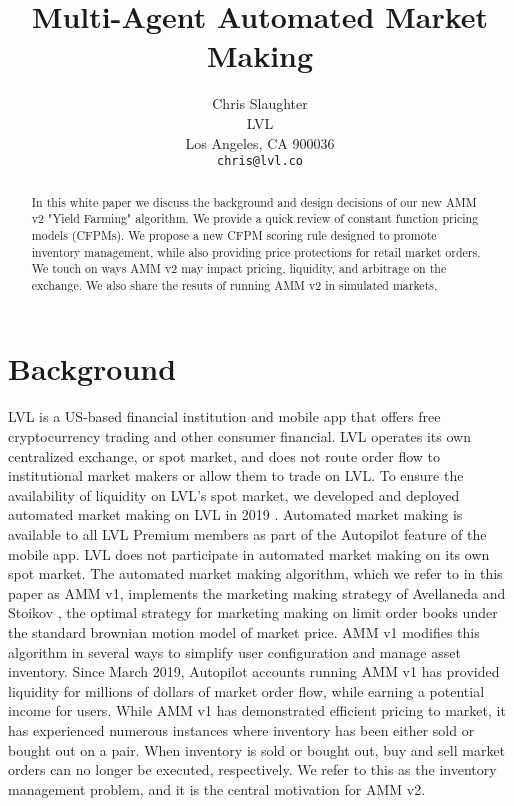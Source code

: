 \documentclass{article}
\title{Multi-Agent Automated Market Making}
\author{
  Chris Slaughter \\
  LVL\\
  Los Angeles, CA 900036 \\
  \texttt{chris@lvl.co}
}
\begin{document}
\maketitle

\begin{abstract}

In this white paper we discuss the background and design decisions of our new AMM v2 "Yield Farming" algorithm. We provide a quick review of constant function pricing models (CFPMs). We propose a new CFPM scoring rule designed to promote inventory management, while also providing price protections for retail market orders. We touch on ways AMM v2 may impact pricing, liquidity, and arbitrage on the exchange. We also share the resuts of running AMM v2 in simulated markets.

\end{abstract}


\section{Background}
\label{sec:background}

LVL is a US-based financial institution and mobile app that offers free cryptocurrency trading and other consumer financial. LVL operates its own centralized exchange, or spot market, and does not route order flow to institutional market makers or allow them to trade on LVL. To ensure the availability of liquidity on LVL's spot market, we developed and deployed automated market making on LVL in 2019 \cite{amm2019}. Automated market making is available to all LVL Premium members as part of the Autopilot feature of the mobile app. LVL does not participate in automated market making on its own spot market. The automated market making algorithm, which we refer to in this paper as AMM v1, implements the marketing making strategy of Avellaneda and Stoikov \cite{avellaneda}, the optimal strategy for marketing making on limit order books under the standard brownian motion model of market price. AMM v1 modifies this algorithm in several ways to simplify user configuration and manage asset inventory. Since March 2019, Autopilot accounts running AMM v1 has provided liquidity for millions of dollars of market order flow, while earning a potential income for users. While AMM v1 has demonstrated efficient pricing to market, it has experienced numerous instances where inventory has been either sold or bought out on a pair. When inventory is sold or bought out, buy and sell market orders can no longer be executed, respectively. We refer to this as the inventory management problem, and it is the central motivation for AMM v2.
\end{document}
